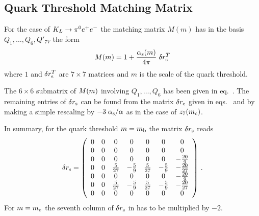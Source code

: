 \subsection{Quark Threshold Matching Matrix}
            \label{sec:HeffKpe:Mm}
For the case of $K_L \to \pi^0 e^+ e^-$ the matching matrix $M(m)$ has in the
basis $Q_1,\ldots,Q_6,Q'_{7V}$ the form
\begin{equation}
M(m) = 1 + \frac{\alpha_{\rm s}(m)}{4 \pi} \; \delta r_{\rm s}^T
\label{eq:MmKpe}
\end{equation}
where $1$ and $\delta r_{\rm s}^T$ are $7 \times 7$ matrices and $m$ is
the scale of the quark threshold.

The $6 \times 6$ submatrix of $M(m)$ involving $Q_1,\ldots,Q_6$ has been
given in eq.~. The remaining entries of $\delta r_{\rm s}$ can
be found from the matrix $\delta r_{\rm e}$ given in eqs.\ 
and  by making a simple rescaling by $-3 \;
\alpha_{\rm s}/\alpha$ as in the case of $z_7(m_{\rm c})$.

In summary, for the quark threshold $m = m_{\rm b}$ the matrix $\delta r_{\rm s}$ reads
\begin{equation}
\delta r_{\rm s} =
\left(
\begin{array}{ccccccc}
0 & 0 & 0 & 0 & 0 & 0 & 0 \\
0 & 0 & 0 & 0 & 0 & 0 & 0 \\
0 & 0 & 0 & 0 & 0 & 0 & -\frac{20}{9} \\
0 & 0 & \frac{5}{27} & -\frac{5}{9} & \frac{5}{27} & -\frac{5}{9} &
  -\frac{20}{27} \\
0 & 0 & 0 & 0 & 0 & 0 & -\frac{20}{9} \\
0 & 0 & \frac{5}{27} & -\frac{5}{9} & \frac{5}{27} & -\frac{5}{9} &
  -\frac{20}{27} \\
0 & 0 & 0 & 0 & 0 & 0 & 0
\end{array}
\right) \, .
\label{eq:drsKpe}
\end{equation}
For $m=m_{\rm c}$ the seventh column of $\delta r_{\rm s}$ in  has
to be multiplied by $-2$.

